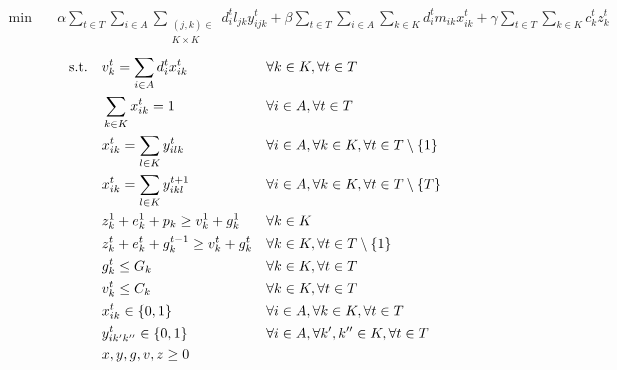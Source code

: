 \begin{align}
    \min\quad       & \alpha \sum_{t \in T} \sum_{i \in A} \sum_{\substack{(j,k) \in \\ K \times K}}d^{t}_{i} l_{jk} y^t_{ijk} + \beta \sum_{t \in T} \sum_{i \in A} \sum_{k \in K}d^{t}_{i} m_{ik} x^t_{ik} + \gamma \sum_{t \in T} \sum_{k \in K}{c_k^t z_k^t}
    \label{eq:complete-obj}
\end{align}
\vspace*{-6mm}
\begin{align}
    \text{s.t.\quad}
    \label{eq:complete-c1}
    & v_k^t = \sum_{i \in A}{d^t_i x_{ik}^t}        &   & \forall k \in K, \forall t \in T                                  \\
    \label{eq:complete-c2}
    & \sum_{k \in K}{x_{ik}^t} = 1                  &   & \forall i \in A, \forall t \in T                                  \\
    \label{eq:complete-c3}
    & x_{ik}^t = \sum_{l \in K}{y_{ilk}^t}          &   & \forall i \in A, \forall k \in K, \forall t \in T \setminus \{1\} \\
    \label{eq:complete-c4}
    & x_{ik}^t = \sum_{l \in K}{y_{ikl}^{t+1}}      &   & \forall i \in A, \forall k \in K, \forall t \in T \setminus \{T\} \\
    \label{eq:complete-c5}
    & z_k^1 + e_k^1 + p_k \geq v_k^1 + g_k^1        &   & \forall k \in K                                                   \\
    \label{eq:complete-c6}
    & z_k^t + e_k^t + g_k^{t-1} \geq v_k^t + g_k^t  &   & \forall k \in K, \forall t \in T \setminus \{1\}                  \\
    \label{eq:complete-c7}
    & g_k^t \leq G_k                                &   & \forall k \in K, \forall t \in T                                  \\
    \label{eq:complete-c8}
    & v_k^t \leq C_k                                &   & \forall k \in K, \forall t \in T                                  \\
    \label{eq:complete-c9}
    & x_{ik}^t \in \{0,1\}                          &   & \forall i \in A, \forall k \in K, \forall t \in T                 \\
    \label{eq:complete-c10}
    & y_{ik'k''}^t \in \{0,1\}                      &   & \forall i \in A, \forall k', k'' \in K, \forall t \in T           \\
    \label{eq:complete-c11}
    & x, y, g, v, z \geq 0                          &   &
\end{align}
